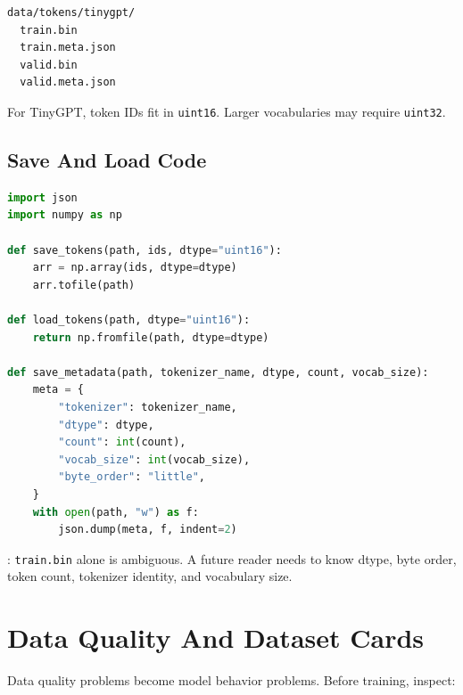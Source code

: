 \begin{lstlisting}
data/tokens/tinygpt/
  train.bin
  train.meta.json
  valid.bin
  valid.meta.json
\end{lstlisting}

For TinyGPT, token IDs fit in \texttt{uint16}. Larger vocabularies may require \texttt{uint32}.

\begin{center}
\end{center}

\subsection{Save And Load Code}

\begin{lstlisting}[language=Python]
import json
import numpy as np

def save_tokens(path, ids, dtype="uint16"):
    arr = np.array(ids, dtype=dtype)
    arr.tofile(path)

def load_tokens(path, dtype="uint16"):
    return np.fromfile(path, dtype=dtype)

def save_metadata(path, tokenizer_name, dtype, count, vocab_size):
    meta = {
        "tokenizer": tokenizer_name,
        "dtype": dtype,
        "count": int(count),
        "vocab_size": int(vocab_size),
        "byte_order": "little",
    }
    with open(path, "w") as f:
        json.dump(meta, f, indent=2)
\end{lstlisting}

: \texttt{train.bin} alone is ambiguous. A future reader needs to know dtype, byte order, token count, tokenizer identity, and vocabulary size.

\section{Data Quality And Dataset Cards}

Data quality problems become model behavior problems. Before training, inspect:


